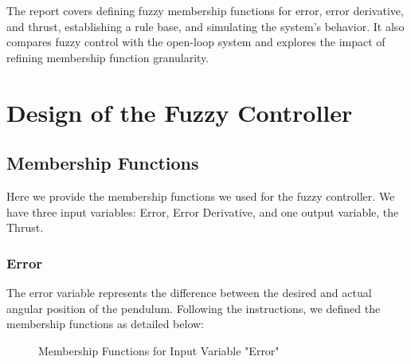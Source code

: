 \documentclass[12pt]{article}
\begin{document}
The report covers defining fuzzy membership functions for error, error derivative, and thrust, establishing a rule base, and simulating the system’s behavior. It also compares fuzzy control with the open-loop system and explores the impact of refining membership function granularity.

\section{Design of the Fuzzy Controller}
\label{sec:design}

\subsection{Membership Functions}

Here we provide the membership functions we used for the fuzzy controller. We have three input variables: Error, Error Derivative, and one output variable, the Thrust. 

\subsubsection{Error}

The error variable represents the difference between the desired and actual angular position of the pendulum. Following the instructions, we defined the membership functions as detailed below:

\begin{figure}[H]
    \centering
    \caption{Membership Functions for Input Variable "Error"}
\end{figure}
\end{document}
